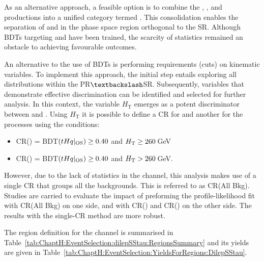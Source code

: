 As an alternative approach, a feasible option is to combine the \ttW, \ttZ, and \ttH productions into a 
unified category termed \ttX. This consolidation enables the separation of \ttbar and \ttX in the phase 
space region orthogonal to the SR. Although BDTs targeting \ttbar and \ttX have been trained, the 
scarcity of statistics remained an obstacle to achieving favourable outcomes. 

An alternative to the use of BDTs is performing requirements (cuts) on kinematic variables. 
To implement this approach, the initial step entails exploring all \dilepSStau distributions within 
the PR$\textbackslash $SR. Subsequently, variables that demonstrate effective \ttbar discrimination 
can be identified and selected for further analysis. In this context, the variable $H_{\text{T}}$ emerges as a potent 
discriminator between \ttbar and \ttX. %
Using $H_{\text{T}}$ it is possible to define a CR for \ttbar and another for the \ttX processes using the 
conditions:
\begin{itemize}
	\item CR(\ttbar) =  BDT$(tHq|_{\text{OS}})\geq 0.40$ and $H_{\text{T}} \geq 260\,$GeV
	\item CR(\ttX) = BDT$(tHq|_{\text{OS}})\geq 0.40$ and $H_{\text{T}} > 260\,$GeV.
\end{itemize}
However, due to the lack of statistics in the \dilepSStau channel, this analysis makes use
of a single CR that groups all the backgrounds. This is referred to as CR(All Bkg).
Studies are carried to evaluate the impact of preforming the profile-likelihood fit with  
CR(All Bkg) on one side, and with CR(\ttbar) and CR(\ttX) on the other side. 
The results with the single-CR method are more robust.

The region definition for the \dilepSStau channel is summarised 
in Table~\ref{tab:ChaptH:EventSelection:dilepSStau:RegionsSummary}
and its yields are given in Table~\ref{tab:ChaptH:EventSelection:YieldsForRegions:DilepSStau}.
 



